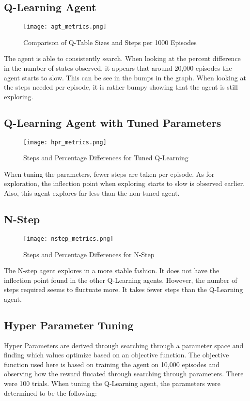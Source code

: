 \documentclass[conference]{IEEEtran}
\begin{document}
\subsection{Q-Learning Agent}
\begin{figure}[htbp]
\centering
\texttt{[image: agt\_metrics.png]}
\caption{Comparison of Q-Table Sizes and Steps per 1000 Episodes }
\label{fig:metrics}
\end{figure}
The agent is able to consistently search. When looking at the percent difference in the number of states observed, it appears
that around 20,000 episodes the agent starts to slow. This can be see in the bumps in the graph. When looking at the steps needed per episode, it is rather bumpy showing that the agent is still exploring. 

\subsection{Q-Learning Agent with Tuned Parameters}
\begin{figure}[htbp]
\centering
\texttt{[image: hpr\_metrics.png]}
\caption{Steps and Percentage Differences for Tuned Q-Learning}
\label{fig:metrics}
\end{figure}
When tuning the parameters, fewer steps are taken per episode. As for exploration, the inflection point when exploring starts to slow is observed earlier. Also, this agent explores far less than the non-tuned agent. 

\subsection{N-Step}
\begin{figure}[htbp]
\centering
\texttt{[image: nstep\_metrics.png]}
\caption{Steps and Percentage Differences for N-Step}
\label{fig:metrics}
\end{figure}
The N-step agent explores in a more stable fashion. It does not have the inflection point found in the other Q-Learning agents. However, the number of steps required seems to fluctuate more. It takes fewer steps than the Q-Learning agent. 

\subsection{Hyper Parameter Tuning}
Hyper Parameters are derived through searching through a parameter space and finding which values optimize based on an objective function. The objective function used here is based on training the agent on 10,000 episodes and observing how the reward flucated through searching through parameters. There were 100 trials. When tuning the Q-Learning agent, the parameters were determined to be the following:
\end{document}
